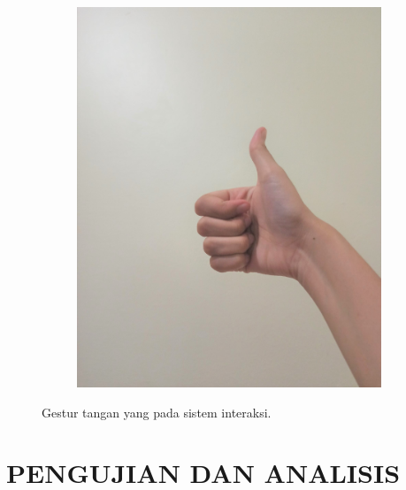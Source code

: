 \documentclass[conference]{IEEEtran}
\begin{document}
\begin{figure} [h]
\begin{center}
\begin{subfigure}[t]{0.11\textwidth}
				\includegraphics[width=\textwidth]{img/pola8d.jpg}
				\caption{\label{fig:gs8d}}
			\end{subfigure}
		\end{center}
			\vspace{-1ex}
			\caption{Gestur tangan yang pada sistem interaksi.}
			\label{fig:gestur_interaksi}
		\end{figure}

	
\section{PENGUJIAN DAN ANALISIS}
\end{document}
